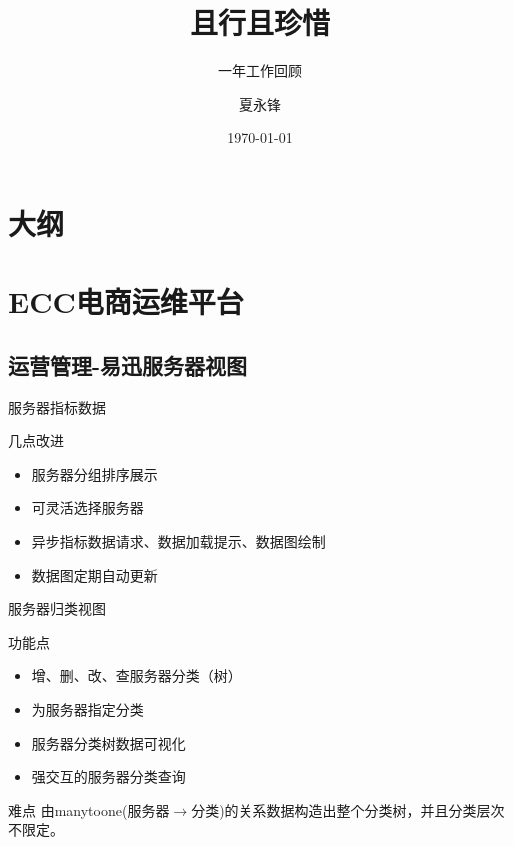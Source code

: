 \documentclass[CJK]{beamer}
\begin{document}
\begin{CJK*}{UTF8}{gbsn}

\title{且行且珍惜}
\subtitle{一年工作回顾}
\author{夏永锋}
\date{\today}

\begin{frame}
\titlepage
\end{frame}

\section*{大纲}
\begin{frame}
\tableofcontents
\end{frame}

\section{ECC电商运维平台}

\subsection{运营管理-易迅服务器视图}

\begin{frame}{服务器指标数据}
	\begin{block}{几点改进}
	\begin{itemize}
	\item 服务器分组排序展示
	\item 可灵活选择服务器
	\item 异步指标数据请求、数据加载提示、数据图绘制
	\item 数据图定期自动更新
	\end{itemize}
	\end{block}
\end{frame}

\begin{frame}{服务器归类视图}
	\begin{block}{功能点}
	\begin{itemize}
	\item 增、删、改、查服务器分类（树）
	\item 为服务器指定分类
	\item 服务器分类树数据可视化
	\item 强交互的服务器分类查询
	\end{itemize}
	\end{block}
	
	\begin{block}{难点}
	由manytoone(服务器$\rightarrow$分类)的关系数据构造出整个分类树，并且分类层次不限定。
	\end{block}
\end{frame}


\end{CJK*}
\end{document}
